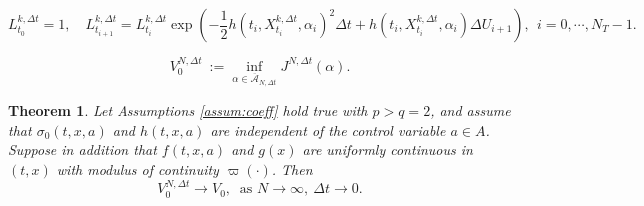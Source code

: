 \documentclass[10pt,a4paper]{amsart}
\newtheorem{theorem}{Theorem}
\begin{document}
	\begin{equation} \label{eq:SDE_L_euler}
		L^{k,\Delta t}_{t_0} = 1,
		\quad 
		L_{t_{i+1}}^{k,\Delta t} = L_{t_i}^{k,\Delta t}\exp\left( -\frac{1}{2}h(t_i, X_{t_i}^{k,\Delta t}, \alpha_i)^2\Delta t + h(t_i, X_{t_i}^{k,\Delta t}, \alpha_i)\Delta U_{i+1} \right),
		~~i=0, \cdots, N_T-1.
	\end{equation}

	\begin{equation} \label{eq:def_V0NDt}
		V_0^{N,\Delta t} 
		~:=
		\inf_{\alpha \in \overline{\mathcal{A}}_{N, \Delta t}} J^{N, \Delta t}(\alpha). 
	\end{equation}

	\begin{theorem} \label{thm:cvg_discrete}
		Let Assumptions \ref{assum:coeff} hold true with $p > q = 2$, 
		and assume that $\sigma_0(t,x,a)$ and $h(t,x,a)$ are independent of the control variable $a \in A$.
		Suppose in addition that $f(t,x,a)$ and $g(x)$ are uniformly continuous in $(t,x)$ with modulus of continuity $\varpi(\cdot)$.
		Then
		\begin{equation*}
			V_0^{N, \Delta t} \longrightarrow V_0,  ~\text{ as }N\longrightarrow \infty,~ \Delta t \longrightarrow 0. 
		\end{equation*}
	\end{theorem}
\end{document}
